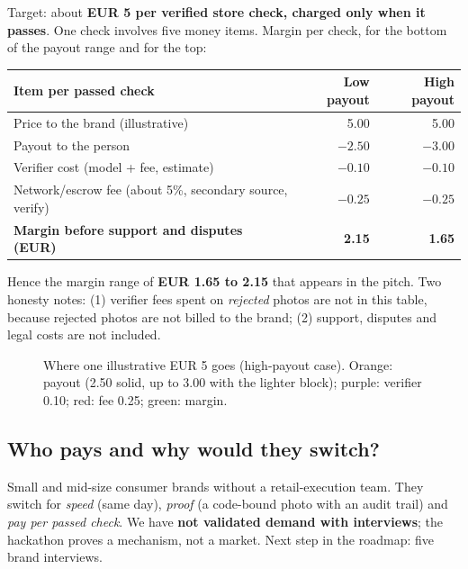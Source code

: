 Target: about \textbf{EUR 5 per verified store check, charged only when it passes}. One check involves five money items. Margin per check, for the bottom of the payout range and for the top:

\begin{center}
\small
\begin{tabular}{@{}lrr@{}}
\toprule
\textbf{Item per passed check} & \textbf{Low payout} & \textbf{High payout}\\
\midrule
Price to the brand (illustrative) & 5.00 & 5.00\\
Payout to the person & $-2.50$ & $-3.00$\\
Verifier cost (model + fee, estimate) & $-0.10$ & $-0.10$\\
Network/escrow fee (about 5\%, secondary source, verify) & $-0.25$ & $-0.25$\\
\midrule
\textbf{Margin before support and disputes (EUR)} & \textbf{2.15} & \textbf{1.65}\\
\bottomrule
\end{tabular}
\end{center}

Hence the margin range of \textbf{EUR 1.65 to 2.15} that appears in the pitch. Two honesty notes: (1) verifier fees spent on \emph{rejected} photos are not in this table, because rejected photos are not billed to the brand; (2) support, disputes and legal costs are not included.

\begin{figure}[htbp]
\centering
{}
\caption{Where one illustrative EUR 5 goes (high-payout case). Orange: payout (2.50 solid, up to 3.00 with the lighter block); purple: verifier 0.10; red: fee 0.25; green: margin.}
\end{figure}

\subsection{Who pays and why would they switch?}
Small and mid-size consumer brands without a retail-execution team. They switch for \emph{speed} (same day), \emph{proof} (a code-bound photo with an audit trail) and \emph{pay per passed check}. We have \textbf{not validated demand with interviews}; the hackathon proves a mechanism, not a market. Next step in the roadmap: five brand interviews.

